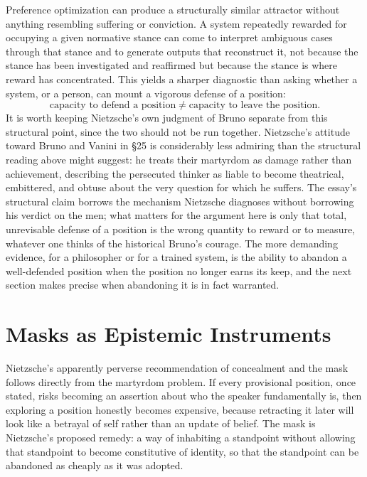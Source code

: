 \documentclass[11pt]{article}
\begin{document}
Preference optimization can produce a structurally similar attractor without anything resembling suffering or conviction. A system repeatedly rewarded for occupying a given normative stance can come to interpret ambiguous cases through that stance and to generate outputs that reconstruct it, not because the stance has been investigated and reaffirmed but because the stance is where reward has concentrated. This yields a sharper diagnostic than asking whether a system, or a person, can mount a vigorous defense of a position:
\[
\text{capacity to defend a position} \neq \text{capacity to leave the position}.
\]
It is worth keeping Nietzsche's own judgment of Bruno separate from this structural point, since the two should not be run together. Nietzsche's attitude toward Bruno and Vanini in \S 25 is considerably less admiring than the structural reading above might suggest: he treats their martyrdom as damage rather than achievement, describing the persecuted thinker as liable to become theatrical, embittered, and obtuse about the very question for which he suffers. The essay's structural claim borrows the mechanism Nietzsche diagnoses without borrowing his verdict on the men; what matters for the argument here is only that total, unrevisable defense of a position is the wrong quantity to reward or to measure, whatever one thinks of the historical Bruno's courage. The more demanding evidence, for a philosopher or for a trained system, is the ability to abandon a well-defended position when the position no longer earns its keep, and the next section makes precise when abandoning it is in fact warranted.

\section{Masks as Epistemic Instruments}

Nietzsche's apparently perverse recommendation of concealment and the mask follows directly from the martyrdom problem. If every provisional position, once stated, risks becoming an assertion about who the speaker fundamentally is, then exploring a position honestly becomes expensive, because retracting it later will look like a betrayal of self rather than an update of belief. The mask is Nietzsche's proposed remedy: a way of inhabiting a standpoint without allowing that standpoint to become constitutive of identity, so that the standpoint can be abandoned as cheaply as it was adopted.
\end{document}
